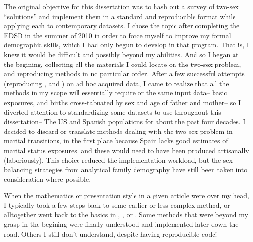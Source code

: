 The original objective for this dissertation was to hash out a survey of two-sex
``solutions'' and implement them in a standard and reproducible format while
applying each to contemporary datasets. I chose the topic after completing the
EDSD in the summer of 2010 in order to force myself to improve my formal
demographic skills, which I had only begun to develop in that program. That
is, I knew it would be difficult and possibly beyond my abilities. And so I
began at the begining, collecting all the materials I could locate on the 
two-sex problem, and reproducing methods in no particular order. After a few 
successful attempts (reproducing \citet{schoen1981harmonic},
\citet{mc1975models} and \citet{henry1972nuptiality}) on ad hoc acquired data, I
came to realize that all the methods in my scope will essentially require or
the same input data-- basic exposures, and births cross-tabuated by
sex and age of father and mother-- so I diverted attention to standardizing some
datasets to use throughout this dissertation-- The US and Spanish populations
for about the past four decades. I decided to discard or translate methods
dealing with the two-sex problem in marital transitions, in the first place 
because Spain lacks good estimates of marital status exposures, 
and these would need to have been produced artisanally (laboriously). This
choice reduced the implementation workload, but the sex balancing strategies
from analytical family demography have still been taken into consideration where
possible.

When the mathematics or
presentation style in a given article were over my head, I typically took a few
steps back to some earlier or less complex method, or alltogether went back to the basics 
in \citet{sharpe1911problem}, \citet{kuczynski1932fertility}, \citet{coale1972growth} 
or \citet{caswell2001matrix}. Some methods that were beyond my grasp in the 
begining \citep[e.g.][]{mitra1978derivation, gupta1978alternative} were finally
understood and implemented later down the road. Others I still don't understand\cite[e.g.][]{choo2006estimating}, despite having
reproducible code!

